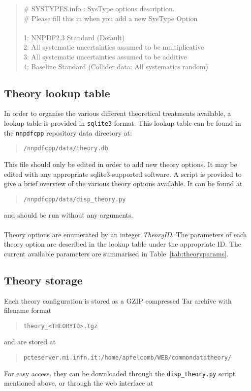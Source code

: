 \documentclass[11pt]{article}
\begin{document}
\begin{quotation}\noindent
\# SYSTYPES.info : SysType options description.\\
\# Please fill this in when you add a new SysType Option\\
\\
1: NNPDF2.3 Standard (Default)\\
2: All systematic uncertainties assumed to be multiplicative\\
3: All systematic uncertainties assumed to be additive\\
4: Baseline Standard (Collider data: All systematics random)
\end{quotation}

\subsection{Theory lookup table}
In order to organise the various different theoretical treatments available, a lookup table
is provided in {\tt sqlite3} format. This lookup table can be found in the {\tt nnpdfcpp} repository data directory at:
\begin{quotation}
    {\tt /nnpdfcpp/data/theory.db}
\end{quotation}
This file should only be edited in order to add new theory options. It may be edited with any appropriate sqlite3-supported software. A script is provided to give a brief overview of the various theory options available. It can be found at
\begin{quotation}
    {\tt /nnpdfcpp/data/disp\_theory.py}
\end{quotation}
and should be run without any arguments.
\\\\
Theory options are enumerated by an integer {\it TheoryID}. The parameters of each theory option are described in the lookup table under the appropriate ID. The current available parameters are summarised in Table~\ref{tab:theoryparams}.

\subsection{Theory storage}

Each theory configuration is stored as a GZIP compressed Tar archive with filename format
\begin{quotation}
    {\tt theory\_<THEORYID>.tgz}
\end{quotation}
and are stored at
\begin{quotation}
    {\tt pcteserver.mi.infn.it:/home/apfelcomb/WEB/commondatatheory/}
\end{quotation}
For easy access, they can be downloaded through the {\tt disp\_theory.py} script mentioned above, or through the web interface at
\end{document}

